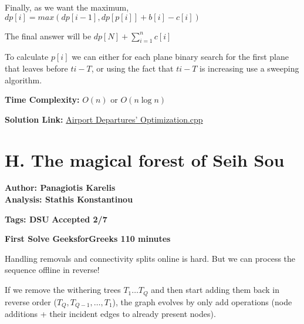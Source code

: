 \documentclass{article}
\begin{document}
\noindent Finally, as we want the maximum, $dp[i] = max(dp[i-1], dp[p[i]]+b[i]-c[i])$

\vspace{1em}

\noindent The final answer will be $dp[N] +  \sum_{i=1}^{n} c[i]$

\vspace{1em}

\noindent To calculate $p[i]$ we can either for each plane binary search for the first plane that leaves before $ti-T$, or using the fact that $ti-T$ is increasing use a sweeping algorithm.

\vspace{1em}

\noindent \textbf{Time Complexity:}
$O(n)$ or $O(n\log n)$

\vspace{1em}
\noindent \textbf{Solution Link:} 
    \href{https://github.com/StathisKons/GRCPC-2024-Editorial-Implementations/blob/main/Sample%20Implementations/G.%20Airport%20Departures%E2%80%99%20Optimization.cpp}{Airport Departures’ Optimization.cpp}

\newpage
\vspace{5em}

\section*{H. The magical forest of Seih Sou}

    \textbf{Author: Panagiotis Karelis}\\
    \textbf{Analysis: Stathis Konstantinou}
    
    \vspace{2em}
    \noindent \textbf{Tags: DSU} 
    \hfill \textbf{Accepted 2/7}
    
    \hfill \textbf{First Solve  GeeksforGreeks 110 minutes}
    
    \vspace{2em}
    
    
    \noindent
        Handling removals and connectivity splits online is hard. But we can process the sequence offline in reverse!
    
    \vspace{0.5em}
    
    \noindent
        If we remove the withering trees $ T_1 \dots T_Q $  and then start adding them back in reverse order ($ T_Q, T_{Q-1},\dots, T_1 $), the graph evolves by only add operations (node additions + their incident edges to already present nodes).
        
\end{document}
